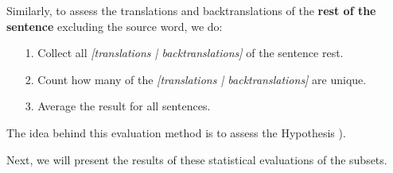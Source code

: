 Similarly, to assess the translations and backtranslations of the \textbf{rest of the sentence} excluding the source word, we do:
\begin{enumerate}
    \item[1. ] Collect all \textit{[translations | backtranslations]} of the sentence rest.
    \item[2. ] Count how many of the \textit{[translations | backtranslations]} are unique.
    \item[3. ] Average the result for all sentences.
\end{enumerate}

The idea behind this evaluation method is to assess the Hypothesis ).

Next, we will present the results of these statistical evaluations of the subsets.


